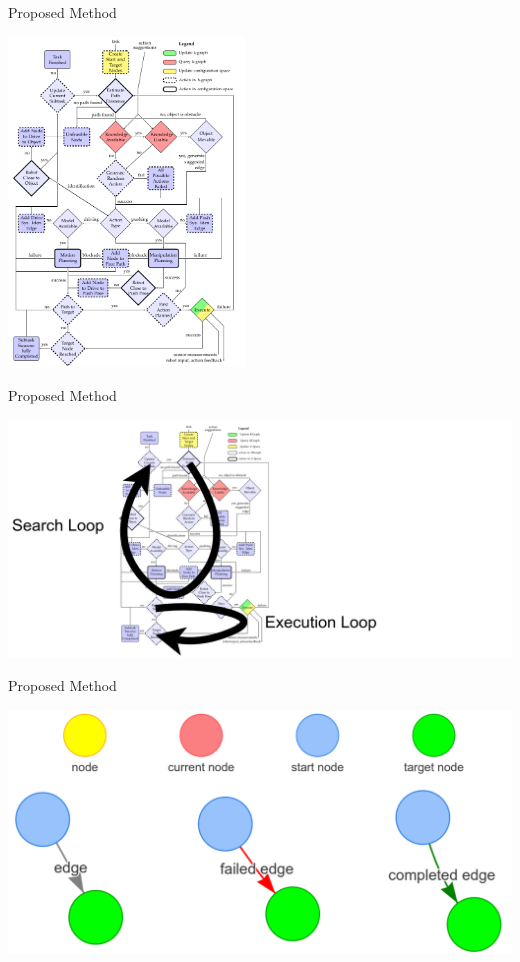 \begin{frame}[fragile]{Proposed Method}
  \vspace{-0.5cm}
  \begin{center}
    \includegraphics[width=0.47\textwidth]{figures/proposed_method/tikz_flowchart_halgorithm}
  \end{center}
\end{frame}

\begin{frame}[fragile]{Proposed Method} 
  \begin{center}
    \includegraphics[width=1.2\textwidth]{figures/proposed_method/two_loops_identified}
  \end{center}
\end{frame}

\begin{frame}[fragile]{Proposed Method} 
  \begin{center}
    \includegraphics[width=1.0\textwidth]{figures/proposed_method/hgraph_legend}
  \end{center}
\end{frame}


